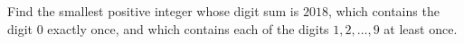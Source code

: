 Find the smallest positive integer whose digit sum is $2018$, which contains the digit $0$ exactly once, and which contains each of the digits $1,2,\dots,9$ at least once.
